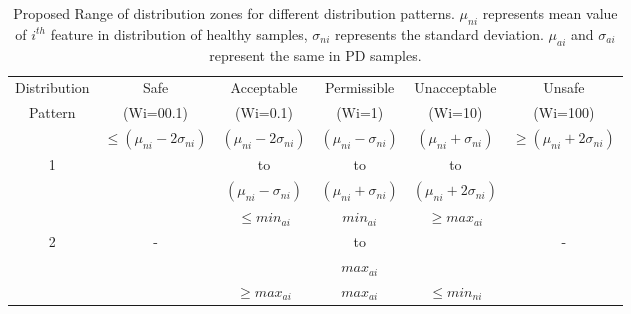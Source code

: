 \documentclass[journal] {article}
\begin{document}
\begin{table}[htb]
\caption{Proposed Range of distribution zones for different distribution patterns. $\mu_{ni}$ represents mean value of $i^{th}$ feature in distribution of healthy samples, $\sigma_{ni}$ represents the standard deviation. $\mu_{ai}$ and $\sigma_{ai}$  represent the same in PD samples.}
	\centering
		\begin{tabular} {c c c c c c }\hline
				 			
				Distribution  & Safe & Acceptable & Permissible & Unacceptable & Unsafe\\ 
				Pattern & (Wi=00.1) & (Wi=0.1) & (Wi=1) & (Wi=10) & (Wi=100)\\ \hline
				 & $\leq(\mu_{ni} - 2\sigma_{ni})$ & $(\mu_{ni} - 2\sigma_{ni})$ & $(\mu_{ni} - \sigma_{ni})$ & $(\mu_{ni} + \sigma_{ni})$ & $\geq (\mu_{ni} + 2\sigma_{ni})$ \\
				1 &               & to           & to          & to          & \\
				 &                & $(\mu_{ni} - \sigma_{ni})$  & $(\mu_{ni} + \sigma_{ni})$ & $(\mu_{ni} + 2\sigma_{ni})$ & \\ \hline
				
  &                & $\leq min_{ai}$ & $ min_{ai}$ & $\geq max_{ai}$ &  \\
2 &        -       &                  &to           &                  & - \\
	&                &                 & $max_{ai}$ &                   & \\ 

	 &   & $\geq max_{ai}$  &  $max_{ai}$      & $\leq min_{ni} $ & \\ \hline 
			
		\end{tabular}
	
	\label{table3}
\end{table}
	
		
		
		
		
		
		
\end{document}
